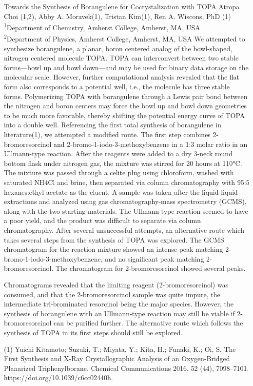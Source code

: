 \makeabstract
{
Towards the Synthesis of Borangulene for Cocrystalization with TOPA
}
{
Atropa Choi (1,2), Abby A. Moravek(1), Tristan Kim(1), Ren A. Wiscons, PhD (1)
}
{
\textsuperscript{1}Department of Chemistry, Amherst College, Amherst, MA, USA\\
\textsuperscript{2}Department of Physics, Amherst College, Amherst, MA, USA
}
{
We attempted to synthesize borangulene, a planar, boron centered analog of the bowl-shaped, nitrogen centered molecule TOPA. TOPA can interconvert between two stable forms—bowl up and bowl down—and may be used for binary data storage on the molecular scale. However, further computational analysis revealed that the flat form also corresponds to a potential well, i.e., the molecule has three stable forms. Polymerizing TOPA with borangulene through a Lewis pair bond between the nitrogen and boron centers may force the bowl up and bowl down geometries to be much more favorable, thereby shifting the potential energy curve of TOPA into a double well. 
}
{
Referencing the first total synthesis of borangulene in literature(1), we attempted a modified route. The first step combines 2-bromoresorcinol and 2-bromo-1-iodo-3-methoxybenzene in a 1:3 molar ratio in an Ullmann-type reaction. After the reagents were added to a dry 3-neck round bottom flask under nitrogen gas, the mixture was stirred for 20 hours at 110°C. The mixture was passed through a celite plug using chloroform, washed with saturated NH4Cl and brine, then separated via column chromatography with 95:5 hexanes:ethyl acetate as the eluent. A sample was taken after the liquid-liquid extractions and analyzed using gas chromatography-mass spectrometry (GCMS), along with the two starting materials. 
}
{
The Ullmann-type reaction seemed to have a poor yield, and the product was difficult to separate via column chromatography. After several unsuccessful attempts, an alternative route which takes several steps from the synthesis of TOPA was explored. The GCMS chromatogram for the reaction mixture showed an intense peak matching 2-bromo-1-iodo-3-methoxybenzene, and no significant peak matching 2-bromoresorcinol. The chromatogram for 2-bromoresorcinol showed several peaks. 
}
{
Chromatograms revealed that the limiting reagent (2-bromoresorcinol) was consumed, and that the 2-bromoresorcinol sample was quite impure, the intermediate tri-brominated resorcinol being the major species. However, the synthesis of borangulene with an Ullmann-type reaction may still be viable if 2-bromoresorcinol can be purified further. The alternative route which follows the synthesis of TOPA in its first steps should still be explored. 

(1) Yuichi Kitamoto; Suzuki, T.; Miyata, Y.; Kita, H.; Funaki, K.; Oi, S. The First Synthesis and X-Ray Crystallographic Analysis of an Oxygen-Bridged Planarized Triphenylborane. Chemical Communications 2016, 52 (44), 7098–7101. https://doi.org/10.1039/c6cc02440h.
}

\newpage
